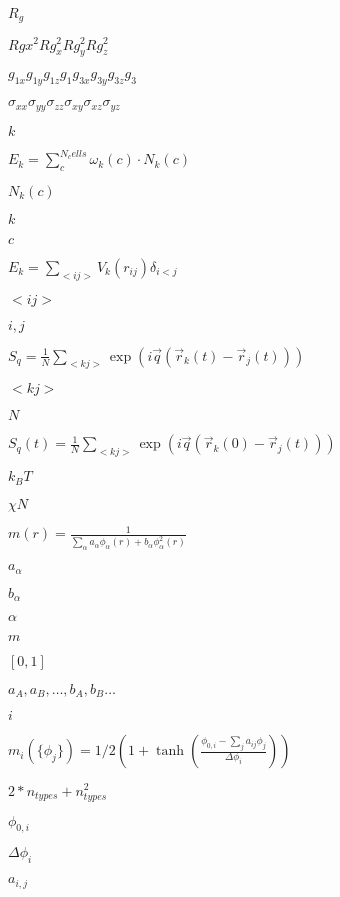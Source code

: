 \documentclass{article}
\begin{document}
$ R_g $
\pagebreak

$ Rgx^2 Rg_x^2 Rg_y^2 Rg_z^2 $
\pagebreak

$ g_{1x} g_{1y} g_{1z} g_{1} g_{3x} g_{3y} g_{3z} g_{3}$
\pagebreak

$ \sigma_{xx} \sigma_{yy} \sigma_{zz} \sigma_{xy} \sigma_{xz} \sigma_{yz}$
\pagebreak

$ k $
\pagebreak

$ E_k = \sum_{c}^{N_cells} \omega_k(c) \cdot N_k(c) $
\pagebreak

$ N_k(c) $
\pagebreak

$k$
\pagebreak

$c$
\pagebreak

$ E_k = \sum_{<ij>} V_k(r_{ij}) \delta_{i<j} $
\pagebreak

$ <ij> $
\pagebreak

$ i,j$
\pagebreak

$ S_q = \frac{1}{N}\sum_{<kj>} \exp(i\vec{q}(\vec{r}_k(t)-\vec{r}_j(t)))$
\pagebreak

$ <kj> $
\pagebreak

$ N $
\pagebreak

$ S_q(t) = \frac{1}{N}\sum_{<kj>} \exp(i\vec{q}(\vec{r}_k(0)-\vec{r}_j(t)))$
\pagebreak

$ k_B T$
\pagebreak

$ \chi N$
\pagebreak

$ m(r) = \frac{1}{\sum_{\alpha} a_\alpha \phi_\alpha(r) + b_\alpha \phi^2_\alpha (r)} $
\pagebreak

$ a_\alpha $
\pagebreak

$ b_\alpha $
\pagebreak

$ \alpha $
\pagebreak

$ m $
\pagebreak

$ [0,1]$
\pagebreak

$ a_A, a_B, \dots, b_A, b_B \dots $
\pagebreak

$i$
\pagebreak

$ m_i(\{\phi_j\}) = 1/2 \left( 1 + \tanh\left(\frac{\phi_{0,i} - \sum_j a_{ij} \phi_j}{\Delta \phi_{i}}\right)\right) $
\pagebreak

$ 2*n_{types} + n_{types}^2 $
\pagebreak

$\phi_{0,i}$
\pagebreak

$\Delta \phi_i$
\pagebreak

$a_{i,j}$
\pagebreak
\end{document}
